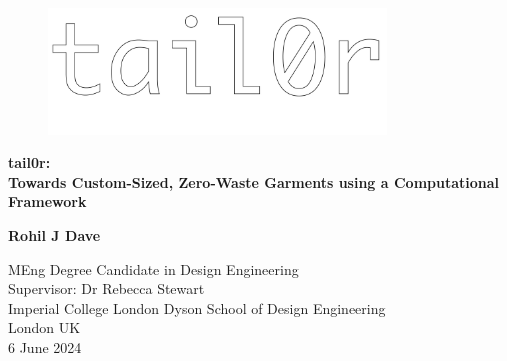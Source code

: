 \begin{titlepage}
    \begin{center}
        \vspace*{1cm}
        \begin{figure} [H]
            \centering
            \includegraphics[width=0.8\textwidth]{Images/tail0r wordmark.png}
        \end{figure}
        
        \Huge
        \textbf{tail0r: \\ Towards Custom-Sized, Zero-Waste Garments using a Computational Framework}

 
        \vspace{1.5cm}
 
 
        \vfill
        
        
        \textbf{Rohil J Dave}
 
        \vspace{0.8cm}
 

 
        \Large
        MEng Degree Candidate in Design Engineering\\
        Supervisor: Dr Rebecca Stewart\\
        Imperial College London Dyson School of Design Engineering\\
        London UK\\
        6 June 2024
 
    \end{center}
\end{titlepage}